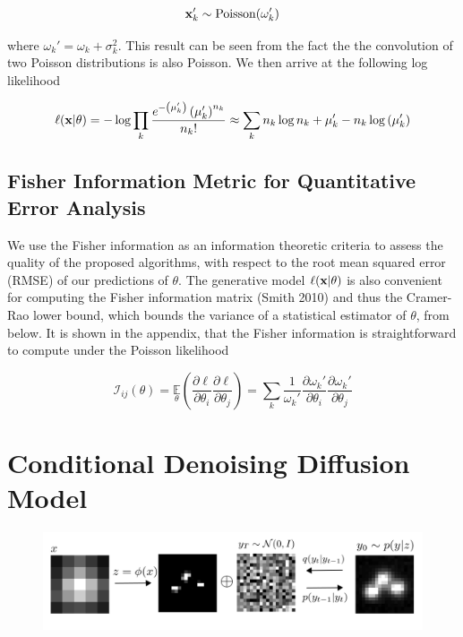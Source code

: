 \documentclass{article}
\begin{document}
\begin{equation}
\bold{x}_{k}' \sim \mathrm{Poisson}(\omega_{k}')
\end{equation}

where $\omega_{k}' = \omega_{k} + \sigma_{k}^{2}$. This result can be seen from the fact the the convolution of two Poisson distributions is also Poisson. We then arrive at the following log likelihood

\begin{equation*}
\ell(\bold{x}|\theta) = -\log \prod_{k} \frac{e^{-\left(\mu_{k}'\right)}\left(\mu_{k}'\right)^{n_{k}}}{n_{k}!}
\approx \sum_{k}  n_{k}\log n_{k} + \mu_{k}' - n_{k}\log\left(\mu_{k}'\right)
\end{equation*}

\subsection{Fisher Information Metric for Quantitative Error Analysis}

We use the Fisher information as an information theoretic criteria to assess the quality of the proposed algorithms, with respect to the root mean squared error (RMSE) of our predictions of $\theta$. The generative model $\ell(\bold{x}|\theta)$ is also convenient for computing the Fisher information matrix (Smith 2010) and thus the Cramer-Rao lower bound, which bounds the variance of a statistical estimator of $\theta$, from below. It is shown in the appendix, that the Fisher information is straightforward to compute under the Poisson likelihood

\begin{equation}
\mathcal{I}_{ij}(\theta) = \underset{\theta}{\mathbb{E}}\left(\frac{\partial \ell}{\partial\theta_{i}}\frac{\partial\ell}{\partial\theta_{j}}\right) = \sum_{k}\frac{1}{\omega_{k}'}\frac{\partial \omega_{k}'}{\partial\theta_{i}}\frac{\partial \omega_{k}'}{\partial\theta_{j}}
\end{equation}

\section{Conditional Denoising Diffusion Model}


\begin{figure}
\includegraphics[scale=4.0]{Denoise.png}
\end{figure}
\end{document}
